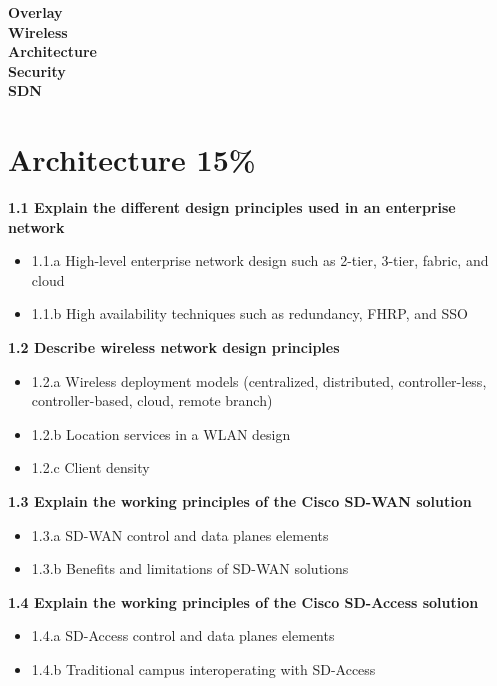\documentclass{article}
\begin{document}
\newpage
\noindent\textbf{Overlay}\\

\newpage
\noindent\textbf{Wireless}\\

\newpage
\noindent\textbf{Architecture}\\

\newpage
\noindent\textbf{Security}\\

\newpage
\noindent\textbf{SDN}\\

\newpage
\section{Architecture 15\%}
\textbf{1.1 Explain the different design principles used in an enterprise network}
\begin{itemize}
\item 1.1.a High-level enterprise network design such as 2-tier, 3-tier, fabric, and cloud
\item 1.1.b High availability techniques such as redundancy, FHRP, and SSO
\end{itemize}

\noindent\textbf{1.2 Describe wireless network design principles}
\begin{itemize}
\item 1.2.a Wireless deployment models (centralized, distributed, controller-less, controller-based, cloud, remote branch)
\item 1.2.b Location services in a WLAN design
\item 1.2.c Client density
\end{itemize}

\noindent\textbf{1.3 Explain the working principles of the Cisco SD-WAN solution}
\begin{itemize}
\item 1.3.a SD-WAN control and data planes elements
\item 1.3.b Benefits and limitations of SD-WAN solutions
\end{itemize}

\noindent\textbf{1.4 Explain the working principles of the Cisco SD-Access solution}
\begin{itemize}
\item 1.4.a SD-Access control and data planes elements
\item 1.4.b Traditional campus interoperating with SD-Access
\end{itemize}
\end{document}
